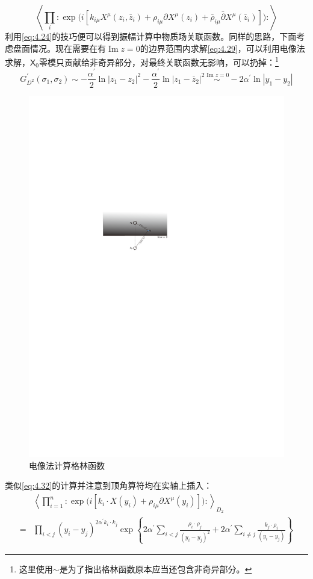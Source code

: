 \begin{equation}
	\left\langle\prod_i:\exp\bigg(i\left[k_{i\mu}X^\mu(z_i,\bar z_i)+\rho_{i\mu}\partial X^\mu(z_i)+\bar\rho_{i\mu}\bar\partial X^\mu(\bar z_i)\right]\bigg):\right\rangle
\end{equation}
利用\ref{eq:4.24}的技巧便可以得到振幅计算中物质场关联函数。同样的思路，下面考虑盘面情况。现在需要在有$\operatorname{Im} z = 0$的边界范围内求解\ref{eq:4.29}，可以利用电像法求解，$\mathsf{X}_0$零模只贡献给非奇异部分，对最终关联函数无影响，可以扔掉：\footnote{这里使用$\sim$是为了指出格林函数原本应当还包含非奇异部分。}
\begin{equation}
	\label{eq:4.36}
	G^{\prime}_{D^2}(\sigma_1,\sigma_2)\sim-\frac{\alpha^{\prime}}{2}\ln|z_1-z_2|^2-\frac{\alpha^{\prime}}{2}\ln|z_1-\overline{z}_2|^2\overset{\operatorname{Im} z = 0}{\sim} -2\alpha^\prime \ln|y_1-y_2|
\end{equation}
\begin{figure}[htbp]
	\centering
	\includegraphics[width=0.8\linewidth]{figs/fig6.pdf}
	\caption{电像法计算格林函数}
	\label{fig:6}
\end{figure}
类似\ref{eq:4.32}的计算并注意到顶角算符均在实轴上插入：
\begin{equation}
	\label{eq:4.37}
	\begin{aligned}
		&\left\langle\prod_{i=1}^n :\exp\bigg(i\left[k_i\cdot X(y_i)+\rho_{i\mu}\partial X^{\mu}(y_i)\right]\bigg):\right\rangle_{D_2}\\
	=&\prod_{i<j}(y_i-y_j)^{2{\alpha^{\prime}}k_i\cdot k_j}\exp\left\{2{\alpha^{\prime}}\sum_{i<j}\frac{\rho_i\cdot\rho_j}{(y_i-y_j)^2}+2\alpha^{\prime}\sum_{i\neq j}\frac{k_j\cdot\rho_i}{(y_i-y_j)}\right\}
	\end{aligned}
\end{equation}
